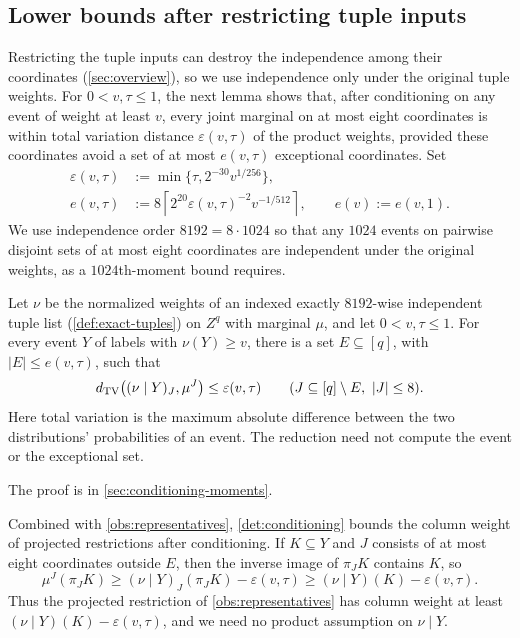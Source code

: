 \documentclass[11pt,letterpaper]{article} \usepackage[utf8]{inputenc}
\theoremstyle{plain} \newtheorem{theorem}{Theorem}[section]
\theoremstyle{definition} \newaliascnt{definition}{theorem}
\newcommand{\ceil}[1]{\left\lceil#1\right\rceil}
\begin{document}
\subsection{Lower bounds after restricting tuple inputs}
\label{sec:retained-tuples}

Restricting the tuple inputs can destroy the independence among their
coordinates (\cref{sec:overview}), so we use independence only under the original
tuple weights. For $0<v,\tau\le1$, the next lemma shows that, after
conditioning on any event of weight at least $v$, every joint marginal on at most eight coordinates
is within total variation distance $\varepsilon(v,\tau)$ of the product
weights, provided these coordinates avoid a set of at most $e(v,\tau)$
exceptional coordinates. Set
\[
\begin{aligned}
\varepsilon(v,\tau)&:=\min\{\tau,2^{-30}v^{1/256}\},\\
e(v,\tau)&:=8\ceil{2^{20}\varepsilon(v,\tau)^{-2}v^{-1/512}},
\qquad e(v):=e(v,1).
\end{aligned}
\]
We use independence order $8192=8\cdot1024$ so that any $1024$ events on
pairwise disjoint sets of at most eight coordinates are independent under
the original weights, as a $1024$th-moment bound requires.

\begin{lemma}\label{det:conditioning}
Let $\nu$ be the normalized weights of an indexed exactly $8192$-wise independent tuple list
(\cref{def:exact-tuples}) on $Z^q$ with marginal $\mu$, and let $0<v,\tau\le1$. For every event
$Y$ of labels with $\nu(Y)\ge v$, there is a set $E\subseteq[q]$, with
$|E|\le e(v,\tau)$, such that
\[
d_{\rm TV}\bigl((\nu\mid Y)_J,\mu^J\bigr)\le\varepsilon(v,\tau)
\qquad
(J\subseteq[q]\setminus E,\ |J|\le8).
\]
Here total variation is the maximum absolute difference between the two
distributions' probabilities of an event. The reduction need not compute the
event or the exceptional set.
\end{lemma}

The proof is in \cref{sec:conditioning-moments}.

Combined with \cref{obs:representatives}, \cref{det:conditioning} bounds the column weight of
projected restrictions after conditioning. If $K\subseteq Y$ and $J$
consists of at most eight coordinates outside $E$, then the inverse image of
$\pi_JK$ contains $K$, so
\[
\mu^J(\pi_JK)
\ge(\nu\mid Y)_J(\pi_JK)-\varepsilon(v,\tau)
\ge(\nu\mid Y)(K)-\varepsilon(v,\tau).
\]
Thus the projected restriction of \cref{obs:representatives} has column weight
at least $(\nu\mid Y)(K)-\varepsilon(v,\tau)$, and we need no product assumption on
$\nu\mid Y$.
\end{document}
